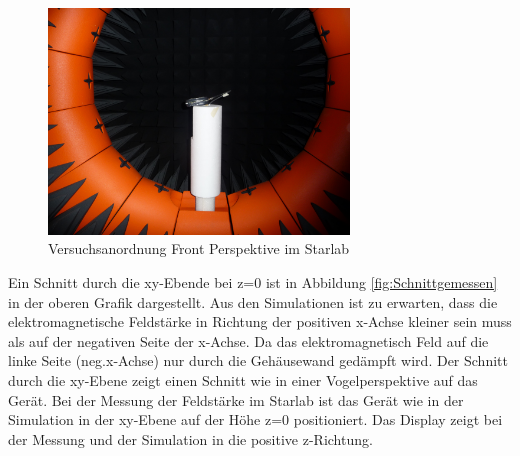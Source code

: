 \begin{figure}[!h]
	\centering
	\includegraphics[width=8cm]{content/bilder/Implementierung/Front.JPG}%
	\caption{Versuchsanordnung Front Perspektive im Starlab}
	\label{fig:FrontStarLab}
\end{figure}
\newpage
Ein Schnitt durch die xy-Ebende bei z=0 ist in Abbildung \ref{fig:Schnittgemessen} in der oberen Grafik dargestellt. Aus den Simulationen ist zu erwarten, dass die elektromagnetische Feldstärke in Richtung der positiven x-Achse kleiner sein muss als auf der negativen Seite der x-Achse. Da das elektromagnetisch Feld auf die linke Seite (neg.x-Achse) nur durch die Gehäusewand gedämpft wird. Der Schnitt durch die xy-Ebene zeigt einen Schnitt wie in einer Vogelperspektive auf das Gerät. Bei der Messung der Feldstärke im Starlab ist das Gerät wie in der Simulation in der xy-Ebene auf der Höhe z=0 positioniert. Das Display zeigt bei der Messung und der Simulation in die positive z-Richtung.    \\
%	

